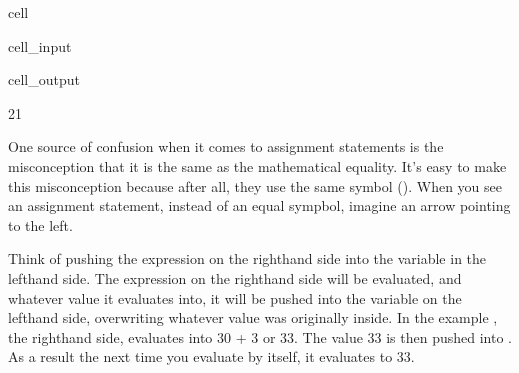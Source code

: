 \documentclass[letterpaper,10pt,english]{jupyterBook}
\begin{document}
\begin{sphinxuseclass}{cell}\begin{sphinxVerbatimInput}

\begin{sphinxuseclass}{cell_input}
\begin{sphinxVerbatim}[commandchars=\\\{\}]
    
\end{sphinxVerbatim}

\end{sphinxuseclass}\end{sphinxVerbatimInput}
\begin{sphinxVerbatimOutput}

\begin{sphinxuseclass}{cell_output}
\begin{sphinxVerbatim}[commandchars=\\\{\}]
21
\end{sphinxVerbatim}

\end{sphinxuseclass}\end{sphinxVerbatimOutput}

\end{sphinxuseclass}
\sphinxAtStartPar
One source of confusion when it comes to assignment statements is the misconception that it is the same as the mathematical equality. It’s easy to make this misconception because after all, they use the same symbol (\sphinxcode{\sphinxupquote{=}}). When you see an assignment statement, instead of an equal sympbol, imagine an arrow pointing to the left.

\begin{sphinxVerbatim}[commandchars=\\\{\}]
    
\end{sphinxVerbatim}

\sphinxAtStartPar
Think of pushing the expression on the right\sphinxhyphen{}hand side into the variable in the left\sphinxhyphen{}hand side. The expression on the right\sphinxhyphen{}hand side will be evaluated, and whatever value it evaluates into, it will be pushed into the variable on the left\sphinxhyphen{}hand side, overwriting whatever value was originally inside. In the example , the right\sphinxhyphen{}hand side, evaluates into 30 + 3 or 33. The value 33 is then pushed into . As a result the next time you evaluate  by itself, it evaluates to 33.
\end{document}
